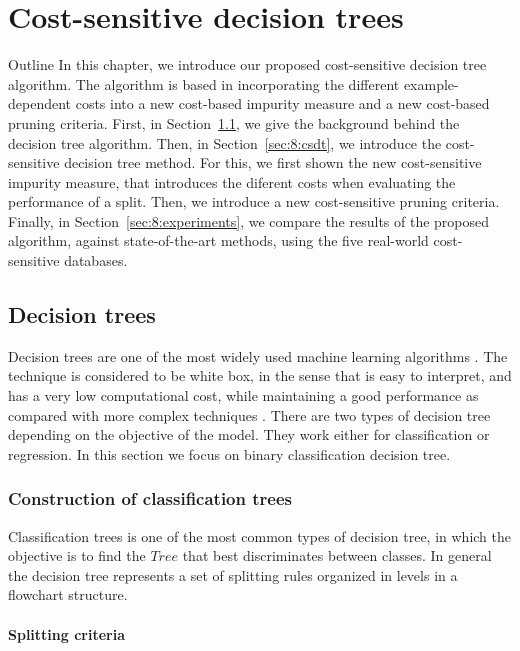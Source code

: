 \chapter{Cost-sensitive decision trees}\label{ch:8}

\begin{remark}{Outline}
In this chapter, we introduce our proposed cost-sensitive decision tree algorithm. The algorithm is 
based in incorporating the different example-dependent costs into a new cost-based impurity measure 
and a new cost-based pruning criteria. First, in Section~\ref{sec:8:dt}, we give the background 
behind the decision tree algorithm. Then, in Section~\ref{sec:8:csdt}, we introduce the 
cost-sensitive decision tree method. For this, we first shown the new cost-sensitive impurity 
measure, that introduces the diferent costs when evaluating the performance of a split. Then, we 
introduce a new cost-sensitive pruning criteria. Finally, in Section~\ref{sec:8:experiments}, we 
compare the results of the proposed algorithm, against state-of-the-art methods, using the five 
real-world cost-sensitive databases.
\end{remark}

\section{Decision trees}
\label{sec:8:dt}

Decision trees are one of the most widely used machine learning algorithms \citep{Lior2008}. 
The technique is considered to be white box, in the sense that is easy to interpret, and has a 
very low computational cost, while maintaining a good performance as compared with more complex 
techniques \citep{Hastie2009}. There are two types of decision tree depending on the objective of 
the model. They work either for classification or regression. In this section we focus on
binary classification decision tree.

\subsection{Construction of classification trees}

Classification trees is one of the most common types of decision tree, in which the objective 
is to find the $Tree$ that best discriminates between classes. In general the decision tree 
represents a set of splitting rules organized in levels in a flowchart structure.

\subsubsection{Splitting criteria}

